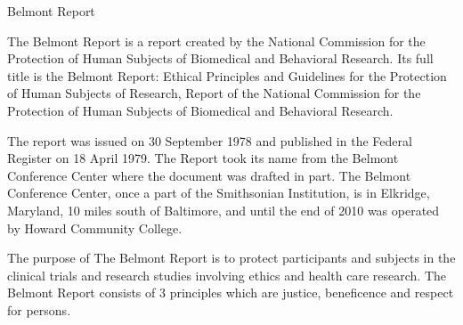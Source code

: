 
Belmont Report


The Belmont Report is a report created by the National Commission for the Protection of Human Subjects of Biomedical and Behavioral Research. Its full title is the Belmont Report: Ethical Principles and Guidelines for the Protection of Human Subjects of Research, Report of the National Commission for the Protection of Human Subjects of Biomedical and Behavioral Research.


The report was issued on 30 September 1978 and published in the Federal Register on 18 April 1979. The Report took its name from the Belmont Conference Center where the document was drafted in part. The Belmont Conference Center, once a part of the Smithsonian Institution, is in Elkridge, Maryland, 10 miles south of Baltimore, and until the end of 2010 was operated by Howard Community College.


The purpose of The Belmont Report is to protect participants and subjects in the clinical trials and research studies involving ethics and health care research. The Belmont Report consists of 3 principles which are justice, beneficence and respect for persons.


